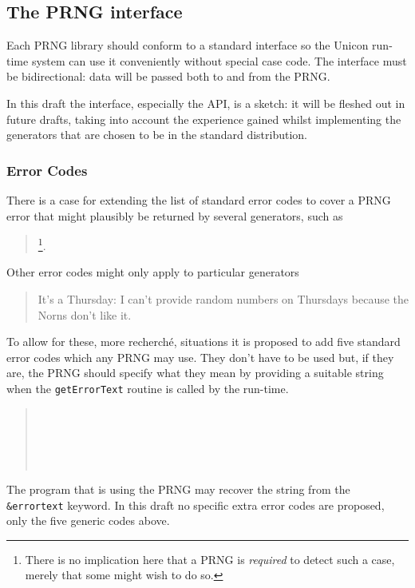 \documentclass[letterpaper,12pt]{article}
\begin{document}
\subsection{The PRNG interface}
Each PRNG library should conform to a standard interface so the Unicon
run-time system can use it conveniently without special case code. The
interface must be bidirectional: data will be passed both to and from the
PRNG.

In this draft the interface, especially the API, is a sketch: it will be
fleshed out in future drafts, taking into account the experience gained
whilst implementing the generators that are chosen to be in the standard
distribution.

\subsubsection{Error Codes}
There is a case for extending the list of standard error codes to cover a
PRNG error that might plausibly be returned by several generators, such as
\begin{quote}
  \footnote{
    There is no implication here that a PRNG is {\em required} to detect
    such a case, merely that some might wish to do so.
    }.
\end{quote}
Other error codes might only apply to particular generators
\begin{quote}
  {It's a Thursday: I can't provide random numbers on Thursdays because
  the Norns don't like it.}
\end{quote}
To allow for these, more recherch\'{e}, situations it is proposed to add
five standard error codes which any PRNG may use. They don't have to be
used but, if they are, the PRNG should specify what they mean by providing
a suitable string when the \texttt{getErrorText} routine is called by the run-time.
\begin{quote}
  \\
  \\
  \\
  \\
\end{quote}
The program that is using the PRNG may recover the string from the
\texttt{\&errortext} keyword.
In this draft no specific extra error codes are proposed, only the five
generic codes above.
\end{document}
